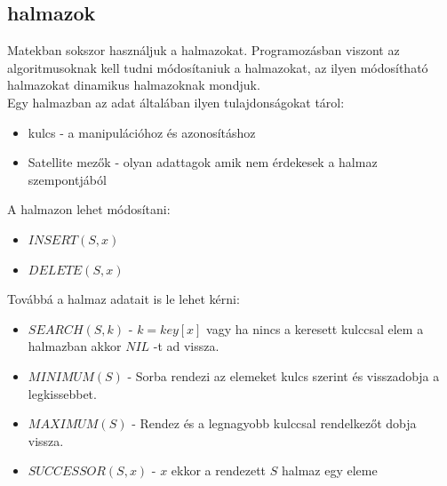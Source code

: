 \documentclass{article}
\theoremstyle{mytheoremstyle}
\theoremstyle{mytheoremstyle}
\theoremstyle{myproblemstyle}
\begin{document}
\subsection{halmazok}
Matekban sokszor használjuk a halmazokat. 
Programozásban viszont az algoritmusoknak kell tudni módosítaniuk 
a halmazokat, az ilyen módosítható halmazokat dinamikus 
halmazoknak mondjuk.\\
Egy halmazban az adat általában ilyen tulajdonságokat tárol:
\begin{itemize}
    \item kulcs - a manipulációhoz és azonosításhoz
    \item Satellite mezők - olyan adattagok amik nem érdekesek a 
    halmaz szempontjából 
\end{itemize} 
A halmazon lehet módosítani:
\begin{itemize}
    \item $INSERT(S,x)$
    \item $DELETE(S,x)$
\end{itemize}
Továbbá a halmaz adatait is le lehet kérni:
\begin{itemize}
    \item $SEARCH(S,k)$ - $k = key[x]$ vagy ha nincs a keresett kulccsal elem a halmazban akkor $NIL$ -t ad vissza.
    \item $MINIMUM(S)$ - Sorba rendezi az elemeket kulcs szerint és visszadobja a legkissebbet.
    \item $MAXIMUM(S)$ - Rendez és a legnagyobb kulccsal rendelkezőt dobja vissza.
    \item $SUCCESSOR(S,x)$ - $x$ ekkor a rendezett $S$ halmaz egy eleme
\end{itemize}
\end{document}
